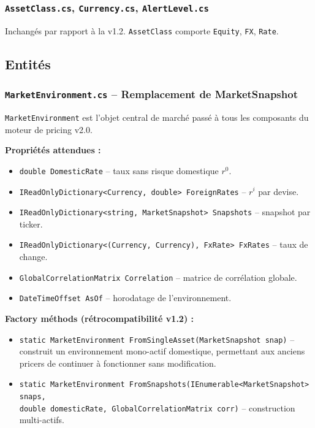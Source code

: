 \documentclass[a4paper,11pt]{article}
\newcommand{\cs}[1]{\texttt{\color{codeinline}#1}}
\begin{document}
\subsubsection{\texttt{AssetClass.cs}, \texttt{Currency.cs}, \texttt{AlertLevel.cs}}

Inchang\'es par rapport \`a la v1.2. \cs{AssetClass} comporte \cs{Equity}, \cs{FX}, \cs{Rate}.

\subsection{Entit\'es}

\subsubsection{\texttt{MarketEnvironment.cs} -- Remplacement de MarketSnapshot}

\cs{MarketEnvironment} est l'objet central de march\'e pass\'e \`a tous les composants
du moteur de pricing v2.0.

\textbf{Propri\'et\'es attendues :}
\begin{itemize}[leftmargin=1.5em]
  \item \cs{double DomesticRate} -- taux sans risque domestique $r^0$.
  \item \cs{IReadOnlyDictionary<Currency, double> ForeignRates} -- $r^i$ par devise.
  \item \cs{IReadOnlyDictionary<string, MarketSnapshot> Snapshots} -- snapshot par ticker.
  \item \cs{IReadOnlyDictionary<(Currency, Currency), FxRate> FxRates} -- taux de change.
  \item \cs{GlobalCorrelationMatrix Correlation} -- matrice de corr\'elation globale.
  \item \cs{DateTimeOffset AsOf} -- horodatage de l'environnement.
\end{itemize}

\textbf{Factory m\'ethods (r\'etrocompatibilit\'e v1.2) :}
\begin{itemize}[leftmargin=1.5em]
  \item \cs{static MarketEnvironment FromSingleAsset(MarketSnapshot snap)} -- construit
        un environnement mono-actif domestique, permettant aux anciens pricers
        de continuer \`a fonctionner sans modification.
  \item \cs{static MarketEnvironment FromSnapshots(IEnumerable<MarketSnapshot> snaps,}\\
        \cs{double domesticRate, GlobalCorrelationMatrix corr)} -- construction multi-actifs.
\end{itemize}
\end{document}
